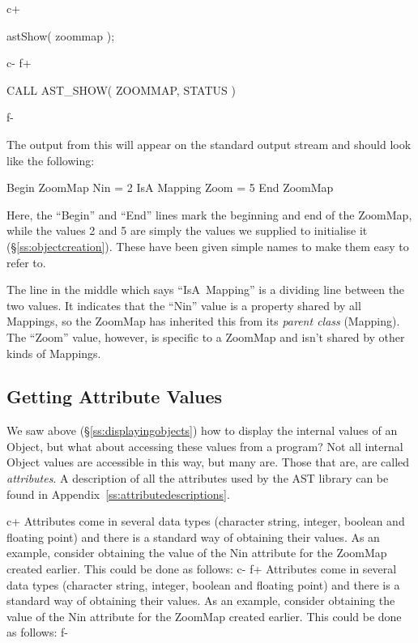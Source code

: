 \documentclass[twoside,11pt]{starlink}
\providecommand{\appref}[1]{Appendix~\ref{#1}}
\providecommand{\secref}[1]{\S\ref{#1}}
\begin{document}
c+
\small
\begin{terminalv}
astShow( zoommap );
\end{terminalv}
\normalsize
c-
f+
\small
\begin{terminalv}
      CALL AST_SHOW( ZOOMMAP, STATUS )
\end{terminalv}
\normalsize
f-

The output from this will appear on the standard output stream and
should look like the following:

\small
\begin{terminalv}
Begin ZoomMap
   Nin = 2
IsA Mapping
   Zoom = 5
End ZoomMap
\end{terminalv}
\normalsize

Here, the ``Begin'' and ``End'' lines mark the beginning and end of
the ZoomMap, while the values 2 and 5 are simply the values we
supplied to initialise it (\secref{ss:objectcreation}). These have
been given simple names to make them easy to refer to.

The line in the middle which says ``IsA~Mapping'' is a dividing line
between the two values. It indicates that the ``Nin'' value is a
property shared by all Mappings, so the ZoomMap has inherited this
from its \emph{parent class} (Mapping). The ``Zoom'' value, however,
is specific to a ZoomMap and isn't shared by other kinds of Mappings.

\subsection{\label{ss:gettingattributes}Getting Attribute Values}

We saw above (\secref{ss:displayingobjects}) how to display the
internal values of an Object, but what about accessing these values
from a program?  Not all internal Object values are accessible in this
way, but many are. Those that are, are called \emph{attributes}. A
description of all the attributes used by the AST library can be found
in \appref{ss:attributedescriptions}.

c+
Attributes come in several data types (character string, integer,
boolean and floating point) and there is a standard way of obtaining
their values. As an example, consider obtaining the value of the Nin
attribute for the ZoomMap created earlier. This could be done as
follows:
c-
f+
Attributes come in several data types (character string, integer,
boolean and floating point) and there is a standard way of obtaining
their values. As an example, consider obtaining the value of the Nin
attribute for the ZoomMap created earlier. This could be done as
follows:
f-
\end{document}
